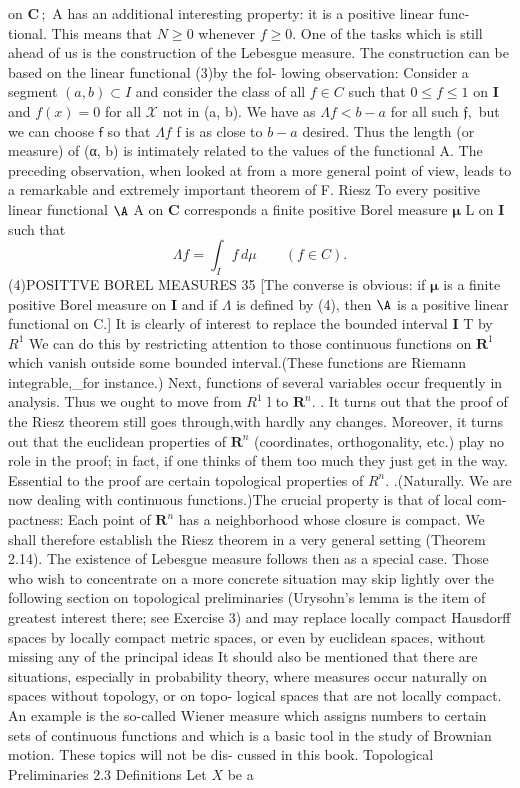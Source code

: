 on ${\boldsymbol{C}}\,;$ A has an additional interesting property: it is a positive linear func- tional. This means that $\scriptstyle N\geq0$ whenever $f\geq0.$ One of the tasks which is still ahead of us is the construction of the Lebesgue measure. The construction can be based on the linear functional (3)by the fol- lowing observation: Consider a segment $(a,b)\subset I$ and consider the class of all $f\in C$ such that $0\leq f\leq1$ on ${\mathbf I}$ and $f(x)=0$ for all $\scriptstyle{\mathcal{X}}$ not in (a, b). We have as $\Lambda f<b-a$ for all such ${\mathfrak{f}},$ but we can choose $\boldsymbol{\mathsf{f}}$ so that $\Lambda f$ f is as close to $b-a$ desired. Thus the length (or measure) of (α, b) is intimately related to the values of the functional A. The preceding observation, when looked at from a more general point of view, leads to a remarkable and extremely important theorem of F. Riesz To every positive linear functional $\mathrm{\A}$ A on ${\mathbf{C}}$ corresponds a finite positive Borel measure $\boldsymbol{\mu}$ L on ${\mathbf I}$ such that $$ \Lambda f=\int_{I}f\,d\mu\qquad(f\in C). $$ (4)POSITTVE BOREL MEASURES 35 [The converse is obvious: if $\boldsymbol{\mu}$ is a finite positive Borel measure on ${\mathbf I}$ and if $\Lambda$ is defined by (4), then $\mathrm{\A}$ is a positive linear functional on C.] It is clearly of interest to replace the bounded interval ${\mathbf I}$ T by $R^{1}$ We can do this by restricting attention to those continuous functions on ${\boldsymbol{R}}^{1}$ which vanish outside some bounded interval.(These functions are Riemann integrable,_for instance.) Next, functions of several variables occur frequently in analysis. Thus we ought to move from $R^{1}$ l to ${\boldsymbol{R}}^{n}.$ . It turns out that the proof of the Riesz theorem still goes through,with hardly any changes. Moreover, it turns out that the euclidean properties of ${\boldsymbol{R}}^{n}$ (coordinates, orthogonality, etc.) play no role in the proof; in fact, if one thinks of them too much they just get in the way. Essential to the proof are certain topological properties of $\textstyle R^{n}.$ .(Naturally. We are now dealing with continuous functions.)The crucial property is that of local com- pactness: Each point of ${\boldsymbol{R}}^{n}$ has a neighborhood whose closure is compact. We shall therefore establish the Riesz theorem in a very general setting (Theorem 2.14). The existence of Lebesgue measure follows then as a special case. Those who wish to concentrate on a more concrete situation may skip lightly over the following section on topological preliminaries (Urysohn's lemma is the item of greatest interest there; see Exercise 3) and may replace locally compact Hausdorff spaces by locally compact metric spaces, or even by euclidean spaces, without missing any of the principal ideas It should also be mentioned that there are situations, especially in probability theory, where measures occur naturally on spaces without topology, or on topo- logical spaces that are not locally compact. An example is the so-called Wiener measure which assigns numbers to certain sets of continuous functions and which is a basic tool in the study of Brownian motion. These topics will not be dis- cussed in this book. Topological Preliminaries 2.3 Definitions Let $X$ be a 